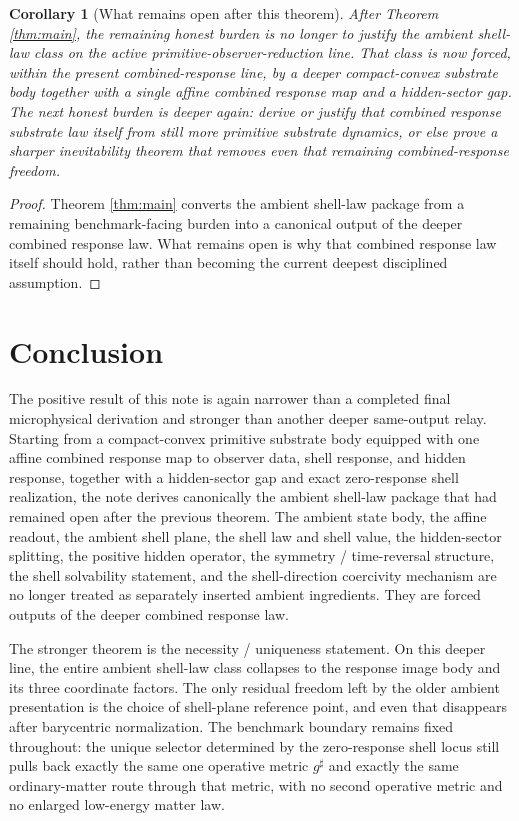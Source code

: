 \documentclass[11pt]{article}
\newcommand{\CompletedMetric}{g^{\sharp}}
\newtheorem{corollary}{Corollary}
\begin{document}
\begin{corollary}[What remains open after this theorem]
\label{cor:next}
After Theorem \ref{thm:main}, the remaining honest burden is no longer to justify the ambient shell-law class on the active primitive-observer-reduction line. That class is now forced, within the present combined-response line, by a deeper compact-convex substrate body together with a single affine combined response map and a hidden-sector gap. The next honest burden is deeper again: derive or justify that combined response substrate law itself from still more primitive substrate dynamics, or else prove a sharper inevitability theorem that removes even that remaining combined-response freedom.
\end{corollary}

\begin{proof}
Theorem \ref{thm:main} converts the ambient shell-law package from a remaining benchmark-facing burden into a canonical output of the deeper combined response law. What remains open is why that combined response law itself should hold, rather than becoming the current deepest disciplined assumption.
\end{proof}

\section{Conclusion}

The positive result of this note is again narrower than a completed final microphysical derivation and stronger than another deeper same-output relay. Starting from a compact-convex primitive substrate body equipped with one affine combined response map to observer data, shell response, and hidden response, together with a hidden-sector gap and exact zero-response shell realization, the note derives canonically the ambient shell-law package that had remained open after the previous theorem. The ambient state body, the affine readout, the ambient shell plane, the shell law and shell value, the hidden-sector splitting, the positive hidden operator, the symmetry / time-reversal structure, the shell solvability statement, and the shell-direction coercivity mechanism are no longer treated as separately inserted ambient ingredients. They are forced outputs of the deeper combined response law.

The stronger theorem is the necessity / uniqueness statement. On this deeper line, the entire ambient shell-law class collapses to the response image body and its three coordinate factors. The only residual freedom left by the older ambient presentation is the choice of shell-plane reference point, and even that disappears after barycentric normalization. The benchmark boundary remains fixed throughout: the unique selector determined by the zero-response shell locus still pulls back exactly the same one operative metric \(\CompletedMetric\) and exactly the same ordinary-matter route through that metric, with no second operative metric and no enlarged low-energy matter law.
\end{document}
